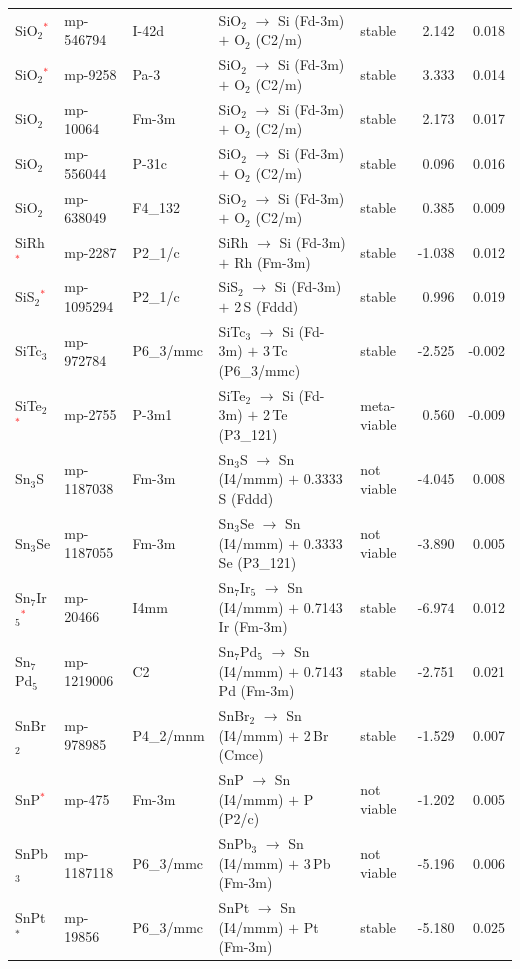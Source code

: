 \begin{longtable}{@{}ll l@{\hspace{4pt}} p{4.6cm} l@{\hspace{4pt}} rr@{}}
SiO$_{2}$\textcolor{red}{$^*$} & mp-546794 & I-42d & SiO$_{2}$ $\to$ Si (Fd-3m) $+$ O$_{2}$ (C2/m) & stable & 2.142 & 0.018 \\
SiO$_{2}$\textcolor{red}{$^*$} & mp-9258 & Pa-3 & SiO$_{2}$ $\to$ Si (Fd-3m) $+$ O$_{2}$ (C2/m) & stable & 3.333 & 0.014 \\
SiO$_{2}$ & mp-10064 & Fm-3m & SiO$_{2}$ $\to$ Si (Fd-3m) $+$ O$_{2}$ (C2/m) & stable & 2.173 & 0.017 \\
SiO$_{2}$ & mp-556044 & P-31c & SiO$_{2}$ $\to$ Si (Fd-3m) $+$ O$_{2}$ (C2/m) & stable & 0.096 & 0.016 \\
SiO$_{2}$ & mp-638049 & F4\_132 & SiO$_{2}$ $\to$ Si (Fd-3m) $+$ O$_{2}$ (C2/m) & stable & 0.385 & 0.009 \\
SiRh\textcolor{red}{$^*$} & mp-2287 & P2\_1/c & SiRh $\to$ Si (Fd-3m) $+$ Rh (Fm-3m) & stable & -1.038 & 0.012 \\
SiS$_{2}$\textcolor{red}{$^*$} & mp-1095294 & P2\_1/c & SiS$_{2}$ $\to$ Si (Fd-3m) $+$ 2\,S (Fddd) & stable & 0.996 & 0.019 \\
SiTc$_{3}$ & mp-972784 & P6\_3/mmc & SiTc$_{3}$ $\to$ Si (Fd-3m) $+$ 3\,Tc (P6\_3/mmc) & stable & -2.525 & -0.002 \\
SiTe$_{2}$\textcolor{red}{$^*$} & mp-2755 & P-3m1 & SiTe$_{2}$ $\to$ Si (Fd-3m) $+$ 2\,Te (P3\_121) & meta-viable & 0.560 & -0.009 \\
Sn$_{3}$S & mp-1187038 & Fm-3m & Sn$_{3}$S $\to$ Sn (I4/mmm) $+$ 0.3333\,S (Fddd) & not viable & -4.045 & 0.008 \\
Sn$_{3}$Se & mp-1187055 & Fm-3m & Sn$_{3}$Se $\to$ Sn (I4/mmm) $+$ 0.3333\,Se (P3\_121) & not viable & -3.890 & 0.005 \\
Sn$_{7}$Ir$_{5}$\textcolor{red}{$^*$} & mp-20466 & I4mm & Sn$_{7}$Ir$_{5}$ $\to$ Sn (I4/mmm) $+$ 0.7143\,Ir (Fm-3m) & stable & -6.974 & 0.012 \\
Sn$_{7}$Pd$_{5}$ & mp-1219006 & C2 & Sn$_{7}$Pd$_{5}$ $\to$ Sn (I4/mmm) $+$ 0.7143\,Pd (Fm-3m) & stable & -2.751 & 0.021 \\
SnBr$_{2}$ & mp-978985 & P4\_2/mnm & SnBr$_{2}$ $\to$ Sn (I4/mmm) $+$ 2\,Br (Cmce) & stable & -1.529 & 0.007 \\
SnP\textcolor{red}{$^*$} & mp-475 & Fm-3m & SnP $\to$ Sn (I4/mmm) $+$ P (P2/c) & not viable & -1.202 & 0.005 \\
SnPb$_{3}$ & mp-1187118 & P6\_3/mmc & SnPb$_{3}$ $\to$ Sn (I4/mmm) $+$ 3\,Pb (Fm-3m) & not viable & -5.196 & 0.006 \\
SnPt$^*$ & mp-19856 & P6\_3/mmc & SnPt $\to$ Sn (I4/mmm) $+$ Pt (Fm-3m) & stable & -5.180 & 0.025 \\

\end{longtable}
